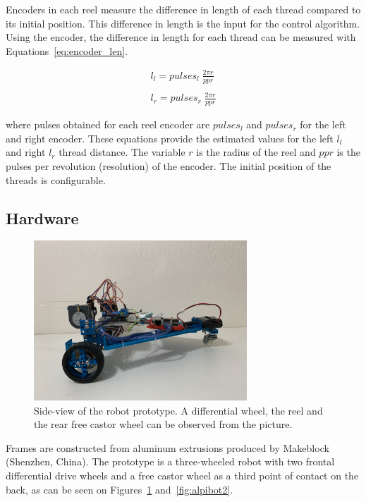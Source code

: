 \documentclass[journal]{IEEEtran}
\begin{document}
Encoders in each reel measure the difference in length of each thread compared to its initial position. This difference in length is the input for the control algorithm.  Using the encoder, the difference in length for each thread can be measured with Equations~\ref{eq:encoder_len}.

\begin{equation}
\label{eq:encoder_len}
\begin{array}{ll}  
l_l = pulses_{l} \; \frac{2\pi r}{ppr}  \\
\\
l_r = pulses_{r} \; \frac{2\pi r}{ppr}
\end{array}
\end{equation}{}

\noindent where pulses obtained for each reel encoder are $pulses_{l}$ and $pulses_{r}$ for the left and right encoder. These equations provide the estimated values for the left $l_l$ and right $l_r$  thread distance. The variable $r$ is the radius of the reel and $ppr$ is the pulses per revolution (resolution) of the encoder.  The initial position of the threads is configurable.

\subsection{Hardware}

\begin{figure}[h!]
\centering
\includegraphics[width=8cm]{images/alpibot1.jpg}
\caption{Side-view of the robot prototype.  A differential wheel, the reel and the rear free castor wheel can be observed from the picture.}
\label{fig:alpibot1}
\end{figure}


Frames are constructed from aluminum extrusions produced by Makeblock (Shenzhen, China).   The prototype is a three-wheeled robot with two frontal differential drive wheels and a free castor wheel as a third point of contact on the back, as can be seen on Figures~\ref{fig:alpibot1} and~\ref{fig:alpibot2}.  
\end{document}
